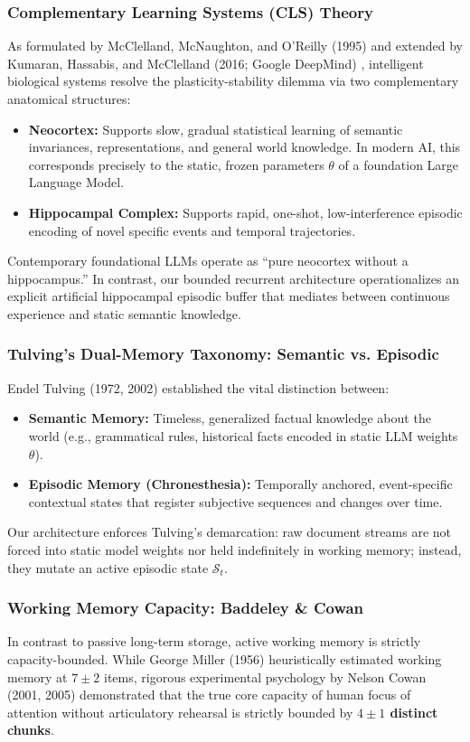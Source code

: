 \documentclass[11pt,a4paper]{article}
\begin{document}
\subsubsection{Complementary Learning Systems (CLS) Theory}
As formulated by McClelland, McNaughton, and O'Reilly (1995) \cite{mcclelland1995cls} and extended by Kumaran, Hassabis, and McClelland (2016; Google DeepMind) \cite{kumaran2016cls}, intelligent biological systems resolve the plasticity-stability dilemma via two complementary anatomical structures:
\begin{itemize}
    \item \textbf{Neocortex:} Supports slow, gradual statistical learning of semantic invariances, representations, and general world knowledge. In modern AI, this corresponds precisely to the static, frozen parameters $\theta$ of a foundation Large Language Model.
    \item \textbf{Hippocampal Complex:} Supports rapid, one-shot, low-interference episodic encoding of novel specific events and temporal trajectories.
\end{itemize}
Contemporary foundational LLMs operate as ``pure neocortex without a hippocampus.'' In contrast, our bounded recurrent architecture operationalizes an explicit artificial hippocampal episodic buffer that mediates between continuous experience and static semantic knowledge.

\subsubsection{Tulving's Dual-Memory Taxonomy: Semantic vs. Episodic}
Endel Tulving (1972, 2002) \cite{tulving2002episodic} established the vital distinction between:
\begin{itemize}
    \item \textbf{Semantic Memory:} Timeless, generalized factual knowledge about the world (e.g., grammatical rules, historical facts encoded in static LLM weights $\theta$).
    \item \textbf{Episodic Memory (Chronesthesia):} Temporally anchored, event-specific contextual states that register subjective sequences and changes over time.
\end{itemize}
Our architecture enforces Tulving's demarcation: raw document streams are not forced into static model weights nor held indefinitely in working memory; instead, they mutate an active episodic state $\mathcal{S}_t$.

\subsubsection{Working Memory Capacity: Baddeley \& Cowan}
In contrast to passive long-term storage, active working memory is strictly capacity-bounded. While George Miller (1956) \cite{miller1956magical} heuristically estimated working memory at $7 \pm 2$ items, rigorous experimental psychology by Nelson Cowan (2001, 2005) \cite{cowan2001magical,cowan2005working} demonstrated that the true core capacity of human focus of attention without articulatory rehearsal is strictly bounded by \textbf{$4 \pm 1$ distinct chunks}.
\end{document}
